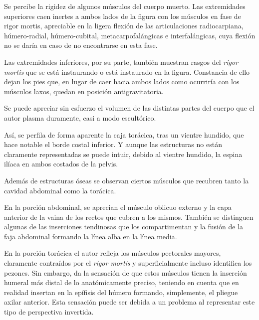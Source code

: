 Se percibe la rigidez de algunos músculos del cuerpo muerto. Las extremidades superiores caen inertes a ambos lados de la figura con los músculos en fase de rigor mortis, apreciable en la ligera flexión de las articulaciones radiocarpiana, húmero-radial, húmero-cubital, metacarpofalángicas e interfalángicas, cuya flexión no se daría en caso de no encontrarse en esta fase.

Las extremidades inferiores, por su parte, también muestran rasgos del \textit{rigor mortis} que se está instaurando o está instaurado en la figura. Constancia de ello dejan los pies que, en lugar de caer hacia ambos lados como ocurriría con los músculos laxos, quedan en posición antigravitatoria.

Se puede apreciar sin esfuerzo el volumen de las distintas partes del cuerpo que el autor plasma duramente, casi a modo escultórico.

Así, se perfila de forma aparente la caja torácica, tras un vientre hundido, que hace notable el borde costal inferior. Y aunque las estructuras no están claramente representadas se puede intuir, debido al vientre hundido, la espina ilíaca en ambos costados de la pelvis.

Además de estructuras óseas se observan ciertos músculos que recubren tanto la cavidad abdominal como la torácica.

En la porción abdominal, %
se aprecian el músculo oblicuo externo y la capa anterior de la vaina de los rectos que cubren a los mismos. También se distinguen algunas de las inserciones tendinosas que los compartimentan y la fusión de la faja abdominal formando la línea alba en la línea media.

En la porción torácica el autor refleja los músculos pectorales mayores, claramente contraídos por el \textit{rigor mortis} y superficialmente incluso identifica los pezones. Sin embargo, da la sensación de que estos músculos tienen la inserción humeral más distal de lo anatómicamente preciso, teniendo en cuenta que en realidad insertan en la epífisis del húmero formando, simplemente, el pliegue axilar anterior. Esta sensación puede ser debida a un problema al representar este tipo de perspectiva invertida. 

